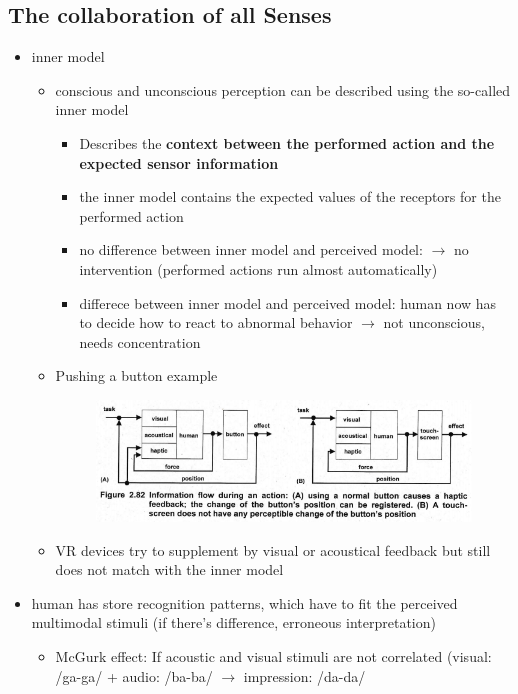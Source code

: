 \documentclass{standalone}
\begin{document}
\subsection{The collaboration of all Senses}
\begin{itemize}		
	\item inner model 
		\begin{itemize}
			\item conscious and unconscious perception can be described using the so-called inner model
			\begin{itemize}
				\item Describes the \textbf{context between the performed action and the expected sensor information}
				\item the inner model contains the expected values of the receptors for the performed action
				\item no difference between inner model and perceived model: $\rightarrow$ no intervention (performed actions run almost automatically)
				\item differece between inner model and perceived model: human now has to decide how to react to abnormal behavior $\rightarrow$ not unconscious, needs concentration
			\end{itemize}
			\item Pushing a button example
			\begin{figure}[H]
					\centering
					\includegraphics[width = 0.7\linewidth]{Figures/2_82.png}
			\end{figure}
			\item VR devices try to supplement by visual or acoustical feedback but still does not match with the inner model 
		\end{itemize}
	\item human has store recognition patterns, which have to fit the perceived multimodal stimuli (if there's difference, erroneous interpretation)
		\begin{itemize}
			\item McGurk effect: If acoustic and visual stimuli are not correlated (visual: /ga-ga/ + audio: /ba-ba/ $\rightarrow$ impression: /da-da/ 
		\end{itemize}

\end{itemize}
\end{document}
